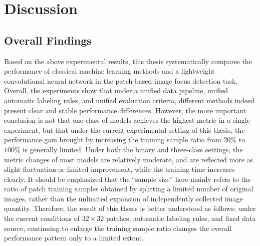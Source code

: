 \chapter{Discussion}
\section{Overall Findings}
\par Based on the above experimental results, this thesis systematically
compares the performance of classical machine learning methods and a
lightweight convolutional neural network in the patch-based image focus
detection task. Overall, the experiments show that under a unified data
pipeline, unified automatic labeling rules, and unified evaluation criteria,
different methods indeed present clear and stable performance differences.
However, the more important conclusion is not that one class of models achieves
the highest metric in a single experiment, but that under the current
experimental setting of this thesis, the performance gain brought by increasing
the training sample ratio from $20\%$ to $100\%$ is generally limited. Under
both the binary and three-class settings, the metric changes of most models are
relatively moderate, and are reflected more as slight fluctuation or limited
improvement, while the training time increases clearly. It should be emphasized
that the ``sample size'' here mainly refers to the ratio of patch training
samples obtained by splitting a limited number of original images, rather than
the unlimited expansion of independently collected image quantity. Therefore,
the result of this thesis is better understood as follows: under the current
conditions of $32\times32$ patches, automatic labeling rules, and fixed data
source, continuing to enlarge the training sample ratio changes the overall
performance pattern only to a limited extent.

